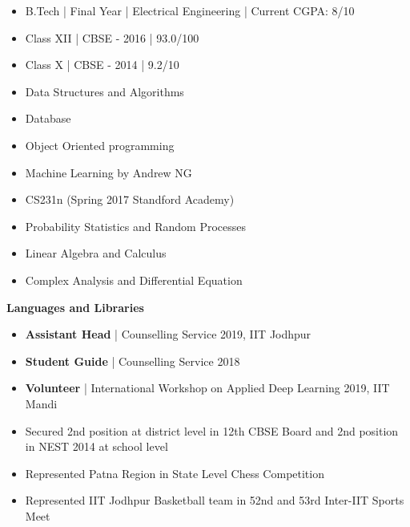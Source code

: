 \begin{itemize}
\item B.Tech | Final Year | Electrical Engineering | Current CGPA: 8/10
\end{itemize}

\begin{itemize}
\item Class XII | CBSE - 2016 | 93.0/100
\item Class X | CBSE - 2014 | 9.2/10
\end{itemize}

\begin{itemize}
\item Data Structures and Algorithms
\item Database 
\item Object Oriented programming
\item Machine Learning by Andrew NG
\item CS231n (Spring 2017 Standford Academy)
\item Probability Statistics and Random
Processes
\item Linear Algebra and Calculus
\item Complex Analysis and Differential
Equation
\end{itemize}


\textbf{Languages and Libraries}\\
\vspace{\topsep}


\begin{itemize}
    \item \textbf{Assistant Head} | Counselling Service 2019, IIT Jodhpur
    \item \textbf{Student Guide} | Counselling Service 2018
    \item \textbf{Volunteer} | International Workshop on Applied Deep Learning
2019, IIT Mandi
    \item Secured 2nd position at district level in 12th CBSE Board and 2nd position in
NEST 2014 at school level
    \item Represented Patna Region in State Level Chess Competition
    \item Represented IIT Jodhpur Basketball team in 52nd and 53rd Inter-IIT Sports Meet
\end{itemize}

\divider
\divider

